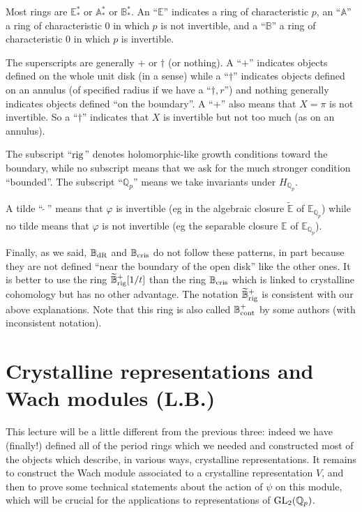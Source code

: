 \documentclass[11pt]{amsart}
\def\Q{{\mathbb Q}_p}
\def\G{{\rm GL}_2(\Q)}
\def\aa{\mathbb{A}}
\def\bb{\mathbb{B}}
\def\ee{\mathbb{E}}
\def\et{\widetilde{\mathbb{E}}}
\def\bcris{\mathbb{B}_{\rm cris}}
\def\bcontp{\widetilde{\mathbb{B}}^+_{\rm rig}}
\def\bdR{\mathbb{B}_{\rm dR}}
\begin{document}
Most rings are $\ee^*_*$ or $\aa^*_*$ or $\bb^*_*$. An ``$\ee$'' 
indicates a ring of characteristic $p$, an ``$\aa$'' a ring of 
characteristic $0$ in which $p$ is not invertible, and a ``$\bb$'' a 
ring of characteristic $0$ in which $p$ is invertible. 
 
The superscripts are generally $+$ or $\dagger$ (or nothing). A 
``$+$'' indicates objects defined on the whole unit disk (in a sense) 
while a ``$\dagger$'' indicates objects defined on an annulus (of 
specified radius if we have a ``$\dagger,r$'') and nothing generally 
indicates objects defined ``on the boundary''. A ``$+$'' also means that 
$X=\pi$ is not invertible. So a ``$\dagger$'' indicates that $X$ is 
invertible but not too much (as on an annulus).  
 
The subscript ``${\rm rig}$'' denotes holomorphic-like growth conditions 
toward the boundary, while no subscript means that we ask for the 
much stronger condition ``bounded''. The subscript ``$\Q$'' means we 
take invariants under $H_{\Q}$.  
 
A tilde ``$\widetilde{\ \ }$'' means that $\varphi$ is invertible  
(eg in the algebraic closure $\et$ of $\ee_{\Q}$) while 
no tilde means that $\varphi$ is not invertible (eg the separable closure 
$\ee$ of $\ee_{\Q}$). 
 
Finally, as we said, $\bdR$ and $\bcris$ do not follow these patterns, 
in part because they are not defined ``near the boundary of the open 
disk'' like the other ones. It is better to use the ring 
$\bcontp[1/t]$ than the ring $\bcris$ which is linked to crystalline 
cohomology but has no other advantage. The notation $\bcontp$ is 
consistent with our above explanations. Note that this ring is also 
called $\bb_{\rm cont}^+$ by some authors (with inconsistent 
notation).  
 
 
\section{Crystalline representations and Wach modules (L.B.)}\label{LB5} 
 
This lecture will be a little different from the previous three: 
indeed we have (finally!) defined all of the period rings which we needed 
and constructed most of the objects which describe, in various ways, 
crystalline representations. It remains to construct the Wach module
associated to a crystalline representation $V$, 
and then to prove some technical statements about the action of $\psi$ 
on this module, which will be crucial for the applications to 
representations of $\G$.  
 
\end{document}
